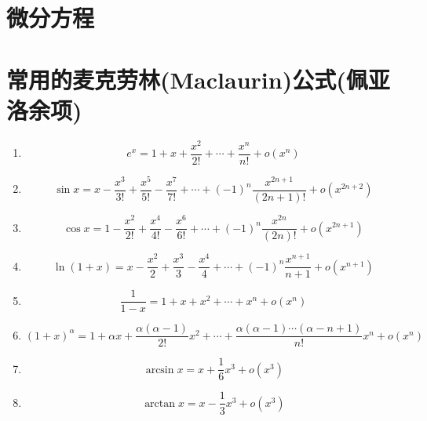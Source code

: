 \documentclass[lang=cn,10pt]{elegantbook}
\begin{document}
\chapter{微分方程}







\appendix
\renewcommand{\thechapter}{\Roman{chapter}}%
\chapter{常用的麦克劳林(Maclaurin)公式(佩亚洛余项)}
\begin{enumerate}
	\item \[ e^{x} = 1 + x + \dfrac{x^{2}}{2!} + \cdots + \dfrac{x^{n}}{n!} + o(x^{n}) \]
	\item \[ \sin x = x - \dfrac{x^{3}}{3!} + \dfrac{x^{5}}{5!} - \dfrac{x^{7}}{7!} + \cdots + (-1)^{n}\dfrac{x^{2n + 1}}{(2n + 1)!} + o(x^{2n + 2}) \]
	\item \[ \cos x = 1 - \dfrac{x^{2}}{2!} + \dfrac{x^{4}}{4!} - \dfrac{x^{6}}{6!} + \cdots + (-1)^{n}\dfrac{x^{2n}}{(2n)!} + o(x^{2n + 1}) \]
	\item \[ \ln(1 + x) = x - \dfrac{x^{2}}{2} + \dfrac{x^{3}}{3} - \dfrac{x^{4}}{4} + \cdots + (-1)^{n}\dfrac{x^{n + 1}}{n + 1} + o(x^{n + 1}) \]
	\item \[ \dfrac{1}{1 - x} = 1 + x + x^{2} + \cdots +x^{n} + o(x^{n}) \]
	\item \[ (1 + x)^{\alpha} = 1 + \alpha x + \dfrac{\alpha(\alpha - 1)}{2!}x^{2} + \cdots + \dfrac{\alpha(\alpha - 1)\cdots(\alpha - n + 1)}{n!}x^{n} + o(x^{n}) \]
	\item \[ \arcsin x = x + \dfrac{1}{6}x^{3} + o(x^{3}) \]
	\item \[ \arctan x = x - \dfrac{1}{3}x^{3} + o(x^{3}) \]
\end{enumerate}
\end{document}
